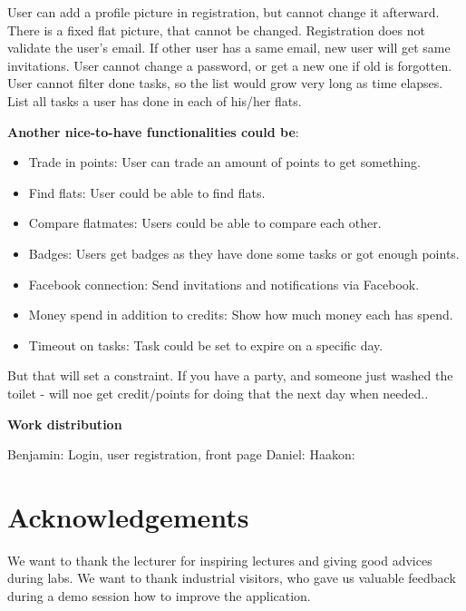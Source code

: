 \documentclass{sig-alt-release2}
\begin{document}
User can add a profile picture in registration, but cannot change it afterward.
There is a fixed flat picture, that cannot be changed.
Registration does not validate the user’s email. If other user has a same email, new user will get same invitations.
User cannot change a password, or get a new one if old is forgotten.
User cannot filter done tasks, so the list would grow very long as time elapses.
List all tasks a user has done in each of his/her flats.

\textbf{Another nice-to-have functionalities could be}:
\begin{itemize}
\item Trade in points: User can trade an amount of points to get something.
\item Find flats: User could be able to find flats.
\item Compare flatmates: Users could be able to compare each other.
\item Badges: Users get badges as they have done some tasks or got enough points.
\item Facebook connection: Send invitations and notifications via Facebook.
\item Money spend in addition to credits: Show how much money each has spend.
\item Timeout on tasks: Task could be set to expire on a specific day.
\end{itemize}
But that will set a constraint. If you have a party, and someone just washed the toilet - will noe get credit/points for doing that the next day when needed..

\textbf{Work distribution}

Benjamin: Login, user registration, front page
Daniel:
Haakon:

\section{Acknowledgements}

We want to thank the lecturer for inspiring lectures and giving good advices during labs.
We want to thank industrial visitors, who gave us valuable feedback during a demo session how to improve the application.



\end{document}
